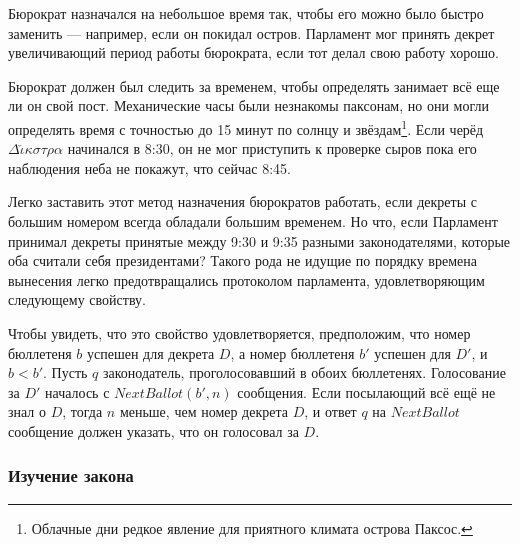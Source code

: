 \documentclass[12pt, a4paper]{article} %
\begin{document}
Бюрократ назначался на небольшое время так, чтобы его можно было быстро заменить --- например, если он покидал остров. Парламент мог принять декрет увеличивающий период работы бюрократа, если тот делал свою работу хорошо.

Бюрократ должен был следить за временем, чтобы определять занимает всё еще ли он свой пост. Механические часы были незнакомы паксонам, но они могли определять время с точностью до 15 минут по солнцу и звёздам\footnote{Облачные дни редкое явление для приятного климата острова Паксос.}. Если черёд $\Delta\check{\iota}\kappa\sigma\tau\rho\alpha$ начинался в 8:30, он не мог приступить к проверке сыров пока его наблюдения неба не покажут, что сейчас 8:45.

Легко заставить этот метод назначения бюрократов работать, если декреты с большим номером всегда обладали большим временем. Но что, если Парламент принимал декреты
принятые между 9:30 и 9:35 разными законодателями, которые оба считали себя президентами? Такого рода не идущие по порядку времена вынесения легко предотвращались протоколом парламента, удовлетворяющим следующему свойству.


Чтобы увидеть, что это свойство удовлетворяется, предположим, что номер бюллетеня $b$ успешен для декрета $D$, а номер бюллетеня $b'$ успешен для $D'$, и $b < b'$. Пусть $q$ законодатель, проголосовавший в обоих бюллетенях. Голосование за $D'$ началось с $NextBallot(b', n)$ сообщения. Если посылающий всё ещё не знал о $D$, тогда $n$ меньше, чем номер декрета $D$, и ответ $q$ на $NextBallot$ сообщение должен указать, что он голосовал за $D$.

\subsubsection{Изучение закона}\label{sec:learningthelaw}
\end{document}
